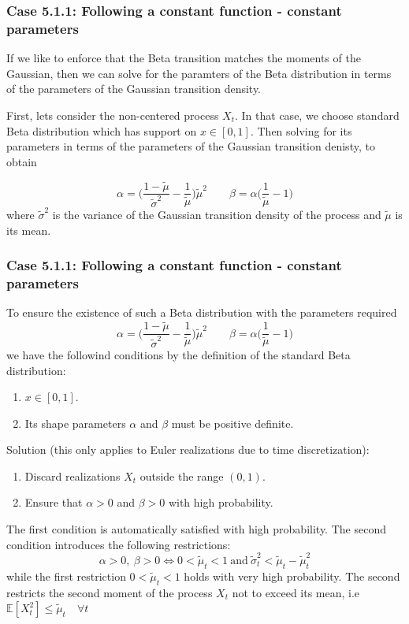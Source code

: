 \documentclass[aspectratio=169]{beamer}\usepackage[utf8]{inputenc}
\newcommand{\E}{\mathbb{E}}
\begin{document}
\begin{frame}\frametitle{ Case 5.1.1: Following a constant function - constant parameters }

If we like to enforce that the Beta transition matches the moments of the Gaussian, then
we can solve for the paramters of the Beta distribution in terms of the parameters of the Gaussian transition density.

First, lets consider the non-centered process $X_t$. In that case, we choose standard Beta distribution which has support on $x \in [0,1]$. Then solving for its parameters in terms of the parameters of the Gaussian transition denisty, to obtain

\begin{equation} 
\alpha = \Big(  \frac{1-\tilde{\mu}}{\tilde{\sigma}^2} -\frac{1}{\tilde{\mu}}   \Big)\tilde{\mu}^2 \quad \quad \beta =  \alpha \Big(\frac{1}{\tilde{\mu}} -1 \Big)
\end{equation}
where $\tilde{\sigma}^2$ is the variance of the Gaussian transition density of the process and $\tilde{\mu}$ is its mean.
\end{frame}

\begin{frame}\frametitle{ Case 5.1.1: Following a constant function - constant parameters }
To ensure the existence of such a Beta distribution with the parameters required
\begin{equation} 
\alpha = \Big(  \frac{1-\tilde{\mu}}{\tilde{\sigma}^2} -\frac{1}{\tilde{\mu}}   \Big)\tilde{\mu}^2 \quad \quad \beta =  \alpha \Big(\frac{1}{\tilde{\mu}} -1 \Big)
\end{equation}
we have the followind conditions by the definition of the standard Beta distribution:
\begin{enumerate}
\item $x \in [0,1]$.
\item Its shape parameters $\alpha$ and $\beta$ must be positive definite.
\end{enumerate}
Solution (this only applies to Euler realizations due to time discretization):
\begin{enumerate}
\item Discard realizations $X_t$ outside the range $(0,1)$.
\item Ensure that $\alpha >0$ and $\beta >0 $ with high probability.
\end{enumerate}
The first condition is automatically satisfied with high probability. The second condition introduces the following restrictions:
\begin{equation}
\alpha >0 ,\ \beta >0 \iff  0< \tilde{\mu}_t < 1  \ \text{and} \  \tilde{\sigma}_t^2 < \tilde{\mu}_t - \tilde{\mu}_t^2
\end{equation}
while the first restriction $ 0< \tilde{\mu}_t < 1$ holds with very high probability. The second restricts the second moment of the process $X_t$ not to exceed its mean,  i.e $\E[X_t^2] \leq \tilde{\mu}_t \quad \forall t$
\end{frame}
\end{document}
